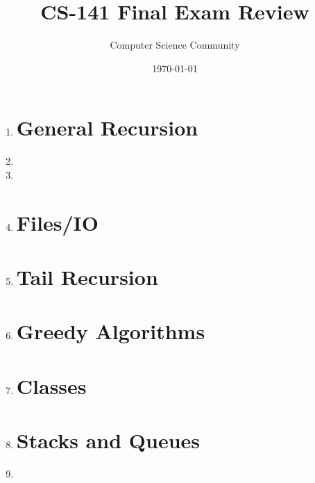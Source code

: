 \documentclass[11pt]{article}
\author{Computer Science Community}
\title{CS-141 Final Exam Review}
\date{\today}
\begin{document}
\header

\begin{enumerate}

\section*{Python Basics}
	\item 

\section*{General Recursion}
	\item 

\newpage
	\item 

	\item 

\vspace{.5in}
\section*{Files/IO}
	\item 

\newpage
\section*{Tail Recursion}
	\item 

\section*{Greedy Algorithms}
	\item 

\newpage
\section*{Classes}
	\item 

\newpage
\section*{Stacks and Queues}
	\item 


\end{enumerate}
\end{document}
